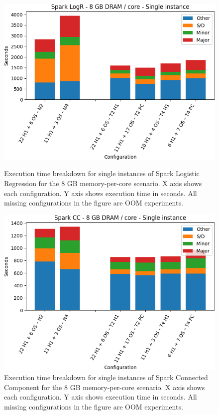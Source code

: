 \begin{figure}[thbp]
        \centering
    \includegraphics[width=\linewidth]{./fig/logr64_single.png}
    \caption{Execution time breakdown for single instances of Spark
    Logistic Regression for the 8 GB memory-per-core scenario. X axis shows each configuration. Y axis shows execution time in seconds. All missing configurations in the figure are OOM experiments.}
    \label{fig:logr64_single}

    \includegraphics[width=\linewidth]{./fig/cc64_single.png}
    \caption{Execution time breakdown for single instances of Spark
    Connected Component for the 8 GB memory-per-core scenario. X axis shows each configuration.
Y axis shows execution time in seconds. All missing configurations in the figure are OOM experiments.}
    \label{fig:cc64_single}
\end{figure}
